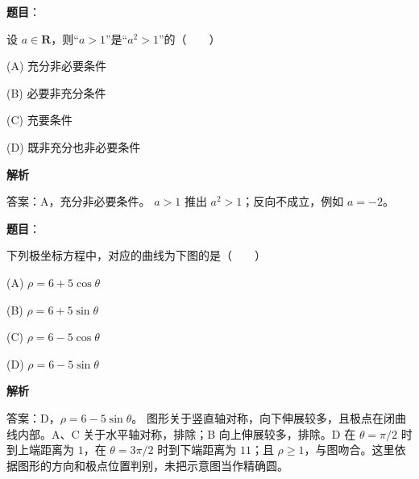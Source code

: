 \begin{answer}

\textbf{题目}：

设 \(a\in\mathbf{R}\)，则“\(a>1\)”是“\(a^2>1\)”的\mbox{（　　）}

\noindent(A) 充分非必要条件

\noindent(B) 必要非充分条件

\noindent(C) 充要条件

\noindent(D) 既非充分也非必要条件

\textbf{解析}

答案：A，充分非必要条件。
\(a>1\) 推出 \(a^2>1\)；反向不成立，例如 \(a=-2\)。


\end{answer}
\begin{answer}

\textbf{题目}：

下列极坐标方程中，对应的曲线为下图的是\mbox{（　　）}
\nopagebreak[4]
\begin{center}\end{center}
\nopagebreak[4]
\noindent(A) \(\rho=6+5\cos\theta\)

\noindent(B) \(\rho=6+5\sin\theta\)

\noindent(C) \(\rho=6-5\cos\theta\)

\noindent(D) \(\rho=6-5\sin\theta\)

\textbf{解析}

答案：D，\(\rho=6-5\sin\theta\)。
图形关于竖直轴对称，向下伸展较多，且极点在闭曲线内部。A、C 关于水平轴对称，排除；B 向上伸展较多，排除。D 在 \(\theta=\pi/2\) 时到上端距离为 \(1\)，在 \(\theta=3\pi/2\) 时到下端距离为 \(11\)；且 \(\rho\ge1\)，与图吻合。这里依据图形的方向和极点位置判别，未把示意图当作精确圆。


\end{answer}
